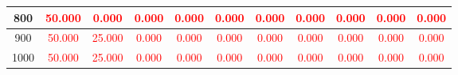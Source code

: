 \documentclass[12]{beamer}
\begin{document}
\begin{frame}
\begin{center}
\begin{adjustbox}{max width=\textwidth}
\begin{tabular}{ |c|c|c|c|c|c|c|c|c|c|c|}
 800 &\textcolor{red}{50.000} &\textcolor{red}{0.000} &\textcolor{red}{0.000} &\textcolor{red}{0.000} &\textcolor{red}{0.000} &\textcolor{red}{0.000} &\textcolor{red}{0.000} &\textcolor{red}{0.000} &\textcolor{red}{0.000} &\textcolor{red}{0.000} \\ 
\hline
 900 &\textcolor{red}{50.000} &\textcolor{red}{25.000} &\textcolor{red}{0.000} &\textcolor{red}{0.000} &\textcolor{red}{0.000} &\textcolor{red}{0.000} &\textcolor{red}{0.000} &\textcolor{red}{0.000} &\textcolor{red}{0.000} &\textcolor{red}{0.000} \\ 
\hline
 1000 &\textcolor{red}{50.000} &\textcolor{red}{25.000} &\textcolor{red}{0.000} &\textcolor{red}{0.000} &\textcolor{red}{0.000} &\textcolor{red}{0.000} &\textcolor{red}{0.000} &\textcolor{red}{0.000} &\textcolor{red}{0.000} &\textcolor{red}{0.000} \\ 
\hline
\end{tabular}
\end{adjustbox}
\end{center}

\end{frame}
\end{document}
